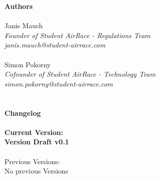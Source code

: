 \documentclass{article}
\newcommand*{\getVersion}{v0.1}
\begin{document}


\tableofcontents{}

\newpage
{\bf Authors}
\\ \\Janis Mauch \emph{\\Founder of Student AirRace - Regulations Team \\janis.mauch@student-airrace.com}
\\ \\ Simon Pokorny \emph{\\Cofounder of Student AirRace - Technology Team \\simon.pokorny@student-airrace.com}
\\ \\ \\
{\bf Changelog}
\\ \\{\bf Current Version: \\Version Draft \getVersion{}}
\\ \\Previous Versions: \\ No previous Versions
\end{document}
